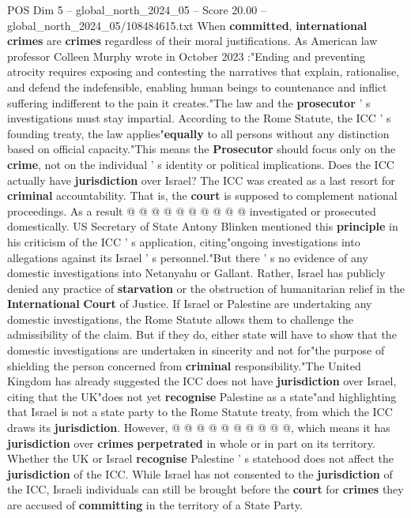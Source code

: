 \begin{textsample}{POS Dim 5 – global\_north\_2024\_05 – Score 20.00 – global\_north\_2024\_05/108484615.txt}
When \textbf{committed}, \textbf{international} \textbf{crimes} are \textbf{crimes} regardless of their moral justifications.
As American law professor Colleen Murphy wrote in October 2023 :"Ending and preventing atrocity requires exposing and contesting the narratives that explain, rationalise, and defend the indefensible, enabling human beings to countenance and inflict suffering indifferent to the pain it creates."The law and the \textbf{prosecutor} ' s investigations must stay impartial.
According to the Rome Statute, the ICC ' s founding treaty, the law applies"\textbf{equally} to all persons without any distinction based on official capacity."This means the \textbf{Prosecutor} should focus only on the \textbf{crime}, not on the individual ' s identity or political implications.
Does the ICC actually have \textbf{jurisdiction} over Israel?
The ICC was created as a last resort for \textbf{criminal} accountability.
That is, the \textbf{court} is supposed to complement national proceedings.
As a result @ @ @ @ @ @ @ @ @ @ investigated or prosecuted domestically.
US Secretary of State Antony Blinken mentioned this \textbf{principle} in his criticism of the ICC ' s application, citing"ongoing investigations into allegations against its Israel ' s personnel."But there ' s no evidence of any domestic investigations into Netanyahu or Gallant.
Rather, Israel has publicly denied any practice of \textbf{starvation} or the obstruction of humanitarian relief in the \textbf{International} \textbf{Court} of Justice.
If Israel or Palestine are undertaking any domestic investigations, the Rome Statute allows them to challenge the admissibility of the claim.
But if they do, either state will have to show that the domestic investigations are undertaken in sincerity and not for"the purpose of shielding the person concerned from \textbf{criminal} responsibility."The United Kingdom has already suggested the ICC does not have \textbf{jurisdiction} over Israel, citing that the UK"does not yet \textbf{recognise} Palestine as a state"and highlighting that Israel is not a state party to the Rome Statute treaty, from which the ICC draws its \textbf{jurisdiction}.
However, @ @ @ @ @ @ @ @ @ @, which means it has \textbf{jurisdiction} over \textbf{crimes} \textbf{perpetrated} in whole or in part on its territory.
Whether the UK or Israel \textbf{recognise} Palestine ' s statehood does not affect the \textbf{jurisdiction} of the ICC.
While Israel has not consented to the \textbf{jurisdiction} of the ICC, Israeli individuals can still be brought before the \textbf{court} for \textbf{crimes} they are accused of \textbf{committing} in the territory of a State Party.

\end{textsample}
